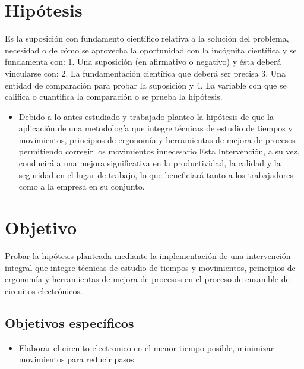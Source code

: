     \section{Hipótesis}
    
    Es la suposición con fundamento científico relativa a la solución del problema, necesidad o de cómo se aprovecha la oportunidad con la incógnita científica y se fundamenta con: 1. Una suposición (en afirmativo o negativo) y ésta deberá vincularse con:
    2. La fundamentación científica que deberá ser precisa 3. Una entidad de comparación para probar la suposición y
    4. La variable con que se califica o cuantifica la comparación o se prueba la hipótesis.
    
    \begin{itemize}
        \item Debido a lo antes estudiado y trabajado planteo la hipótesis de que la aplicación de una metodología que integre técnicas de estudio de tiempos y movimientos, principios de ergonomía y herramientas de mejora de procesos permitiendo corregir los movimientos innecesario Esta Intervención, a su vez, conducirá a una mejora significativa en la productividad, la calidad y la seguridad en el lugar de trabajo, lo que beneficiará tanto a los trabajadores como a la empresa en su conjunto.
        
    
    \end{itemize}
    \section{Objetivo}
    
    Probar la hipótesis planteada mediante la implementación de una intervención integral que integre técnicas de estudio de tiempos y movimientos, principios de ergonomía y herramientas de mejora de procesos en el proceso de ensamble de circuitos electrónicos.
    
       
    
    \subsection{Objetivos específicos }
    
    \begin{itemize}
        \item Elaborar el circuito electronico  en el menor tiempo posible, minimizar movimientos para reducir pasos.
    \end{itemize}
    
